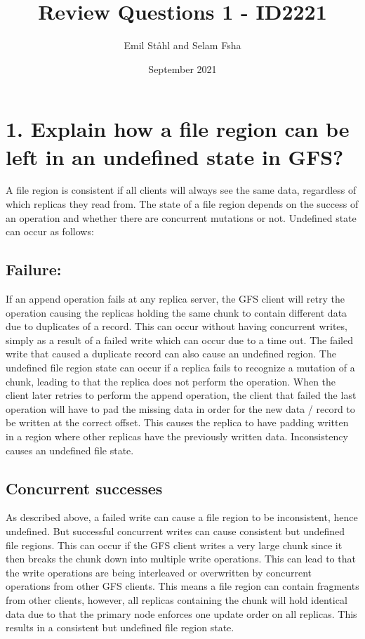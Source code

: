 \documentclass{article}
\title{Review Questions 1 - ID2221}
\author{Emil Ståhl and Selam Fsha}
\date{September 2021}
\begin{document}


\maketitle

\section{1. Explain how a file region can be left in an undefined state in GFS?}

A file region is consistent if all clients will always see the same data, regardless of which replicas they read from. The state of a file region depends on the success of an operation and whether there are concurrent mutations or not. Undefined state can occur as follows:

\subsection*{\textbf{Failure:}}

If an append operation fails at any replica server, the GFS client will retry the operation causing the replicas holding the same chunk to contain different data due to duplicates of a record. This can occur without having concurrent writes, simply as a result of a failed write which can occur due to a time out. The failed write that caused a duplicate record can also cause an undefined region. The undefined file region state can occur if a replica fails to recognize a mutation of a chunk, leading to that the replica does not perform the operation. When the client later retries to perform the append operation, the client that failed the last operation will have to pad the missing data in order for the new data / record to be written at the correct offset. This causes the replica to have padding written in a region where other replicas have the previously written data. Inconsistency causes an undefined file state. 

\subsection*{\textbf{Concurrent successes}}

As described above, a failed write can cause a file region to be inconsistent, hence undefined. But successful concurrent writes can cause consistent but undefined file regions. This can occur if the GFS client writes a very large chunk since it then breaks the chunk down into multiple write operations. This can lead to that the write operations are being interleaved or overwritten by concurrent operations from other GFS clients. This means a file region can contain fragments from other clients, however, all replicas containing the chunk will hold identical data due to that the primary node enforces one update order on all replicas. This results in a consistent but undefined file region state. 
\end{document}
